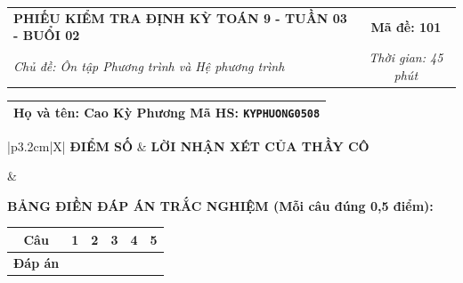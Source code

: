 \documentclass[12pt,a4paper]{article}
\begin{document}
\newpage



\noindent
\begin{tabularx}{\linewidth}{|X|c|}
\hline
\textbf{PHIẾU KIỂM TRA ĐỊNH KỲ TOÁN 9 - TUẦN 03 - BUỔI 02} & \textbf{Mã đề: 101} \\
\textit{Chủ đề: Ôn tập Phương trình và Hệ phương trình} & \textit{Thời gian: 45 phút} \\
\hline
\end{tabularx}

\vspace{1mm}

\noindent
\begin{tabularx}{\linewidth}{|X|}
\hline
\rule[-2mm]{0pt}{7.5mm}\textbf{Họ và tên:} \textbf{\large Cao Kỳ Phương} \hfill \textbf{Mã HS:} \texttt{KYPHUONG0508} \quad \\
\hline
\end{tabularx}

\vspace{1mm}

\noindent
\begin{tabularx}{\linewidth}{|p{3.2cm}|X|}
\hline
\centering\textbf{ĐIỂM SỐ} & \centering\textbf{LỜI NHẬN XÉT CỦA THẦY CÔ} \tabularnewline
\hline
\rule{0pt}{1.3cm} & \tabularnewline
\hline
\end{tabularx}

\vspace{1.2mm}

\noindent\textbf{BẢNG ĐIỀN ĐÁP ÁN TRẮC NGHIỆM (Mỗi câu đúng 0,5 điểm):}
\vspace{0.8mm}

\noindent
\renewcommand{\arraystretch}{1.35}
\begin{tabularx}{\linewidth}{|c|*{5}{>{\centering\arraybackslash}X|}}
\hline
\textbf{Câu} & \textbf{1} & \textbf{2} & \textbf{3} & \textbf{4} & \textbf{5} \\
\hline
\textbf{Đáp án} & & & & & \\
\hline
\end{tabularx}
\renewcommand{\arraystretch}{1.0}

\vspace{1.5mm}
\end{document}
